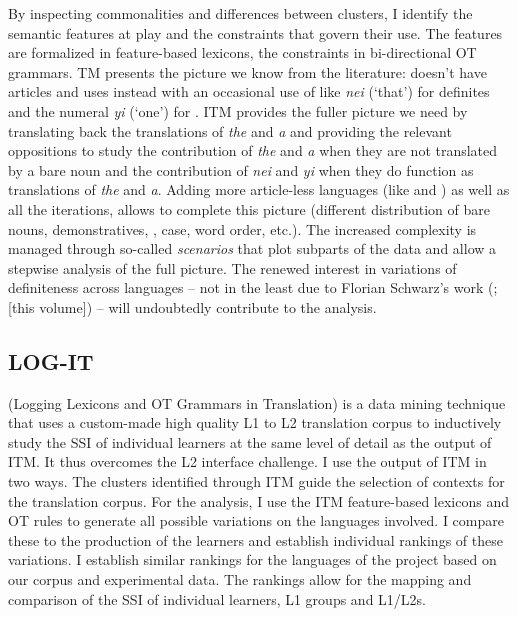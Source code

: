 \documentclass[output=paper,
modfonts
]{langscibook}
\begin{document}
By inspecting commonalities and differences between clusters, I identify the semantic features at play and the constraints that govern their use. The features are formalized in feature-based lexicons, the constraints in bi-directional OT grammars. TM presents the picture we know from the literature:  doesn’t have articles and uses  instead with an occasional use of  like \textit{nei} (‘that’) for definites and the numeral \textit{yi} (‘one’) for . ITM provides the fuller picture we need by translating back the translations of \textit{the} and \textit{a} and providing the relevant oppositions to study the contribution of \textit{the} and \textit{a} when they are not translated by a bare noun and the contribution of \textit{nei} and \textit{yi} when they do function as translations of \textit{the} and \textit{a}. Adding more article-less languages (like  and ) as well as all the iterations, allows to complete this picture (different distribution of bare nouns, demonstratives, , case, word order, etc.). The increased complexity is managed through so-called \textit{scenarios} that plot subparts of the data and allow a stepwise analysis of the full picture. The renewed interest in variations of definiteness across languages -- not in the least due to Florian Schwarz’s work (\citeyear{Schwarz2009}; \citeyear{chapters/Schwarz} [this volume]) -- will undoubtedly contribute to the analysis.

\subsection{LOG-IT}

 (Logging Lexicons and OT Grammars in Translation) is a data mining technique that uses a custom-made high quality L1 to L2 translation corpus to inductively study the SSI of individual learners at the same level of detail as the output of ITM. It thus overcomes the L2 interface challenge. 
I use the output of ITM in two ways. The clusters identified through ITM guide the selection of contexts for the translation corpus. For the analysis, I use the ITM feature-based lexicons and OT rules to generate all possible variations on the languages involved. I compare these to the production of the learners and establish individual rankings of these variations. I establish similar rankings for the languages of the project based on our corpus and experimental data. 
The rankings allow for the mapping and comparison of the SSI of individual learners, L1 groups and L1/L2s. 
\end{document}
